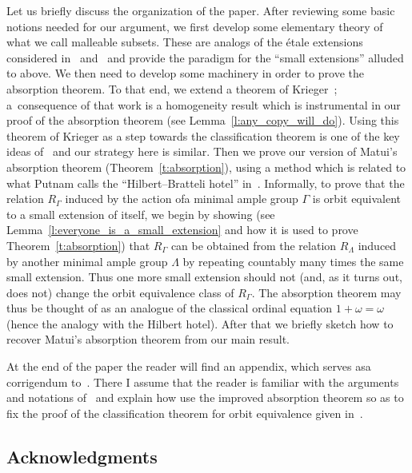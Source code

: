 \documentclass[AHL,Unicode]{cedram}
\newcounter{setofstep}
\newcounter{step}[setofstep]
\begin{document}
Let us briefly discuss the organization of the paper. After reviewing some basic notions needed for our argument, we first develop some elementary theory of what we call malleable subsets. These are analogs of the étale extensions considered in~\cite{Giordano2004,Giordano2008} and~\cite{Matui2008} and provide the paradigm for the ``small extensions'' alluded to above. We then need to develop some machinery in order to prove the absorption theorem. To that end, we extend a theorem of Krieger~\cite{Krieger1979}; a~consequence of that work is a homogeneity result which is instrumental in our proof of the absorption theorem (see Lemma~\ref{l:any_copy_will_do}). Using this theorem of Krieger as a step towards the classification theorem is one of the key ideas of~\cite{Melleray2023} and our strategy here is similar. Then we prove our version of Matui's absorption theorem (Theorem~\ref{t:absorption}), using a method which is related to what Putnam calls the ``Hilbert--Bratteli hotel'' in~\cite{Putnam2018}. Informally, to prove that the relation $R_\Gamma$ induced by the action of\linebreak a minimal ample group $\Gamma$ is orbit equivalent to a small extension of itself, we begin by showing (see Lemma~\ref{l:everyone_is_a_small_extension} and how it is used to prove Theorem~\ref{t:absorption}) that $R_\Gamma$ can be obtained from the relation $R_\Lambda$ induced by another minimal ample group $\Lambda$ by repeating countably many times the same small extension. Thus one more small extension should not (and, as it turns out, does not) change the orbit equivalence class of $R_\Gamma$. The absorption theorem may thus be thought of as an analogue of the classical ordinal equation $1+ \omega=\omega$ (hence the analogy with the Hilbert hotel). After that we briefly sketch how to recover Matui's absorption theorem from our main result.

At the end of the paper the reader will find an appendix, which serves as\linebreak a corrigendum to~\cite{Melleray2023}. There I assume that the reader is familiar with the arguments and notations of~\cite{Melleray2023} and explain how use the improved absorption theorem so as to fix the proof of the classification theorem for orbit equivalence given in~\cite{Melleray2023}.

\subsection*{Acknowledgments}
\end{document}
